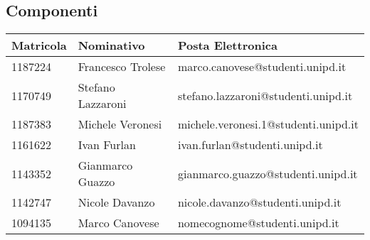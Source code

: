\subsection{Componenti}
\begin{center}

	\begin{longtable}{p{4cm}|p{4cm}|p{6cm}}
		\arrayrulecolor{white}
		\hline
		\rowcolor{blue!20}
		\textbf{Matricola}  &
		\textbf{Nominativo} &
		\textbf{Posta Elettronica}                                              \\
		\hline
		1187224             & Francesco Trolese & marco.canovese@studenti.unipd.it \\
		1170749             & Stefano Lazzaroni & stefano.lazzaroni@studenti.unipd.it \\
		1187383             & Michele Veronesi  & michele.veronesi.1@studenti.unipd.it \\
		1161622             & Ivan Furlan       & ivan.furlan@studenti.unipd.it \\
		1143352             & Gianmarco Guazzo  & gianmarco.guazzo@studenti.unipd.it \\
		1142747             & Nicole Davanzo    & nicole.davanzo@studenti.unipd.it \\
		1094135             & Marco Canovese    & nomecognome@studenti.unipd.it \\
	\end{longtable}
\end{center}
